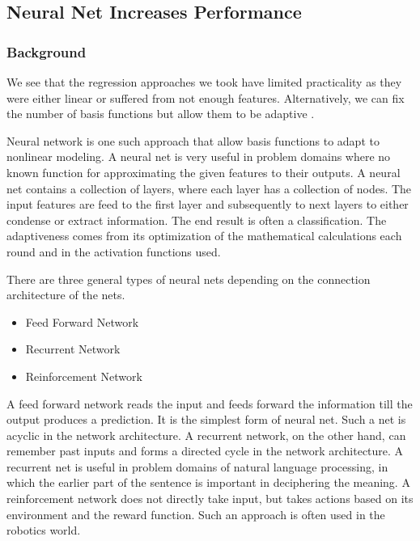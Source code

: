 \documentclass[]{article}
\begin{document}

\subsection{Neural Net Increases Performance}

\subsubsection{Background}

We see that the regression approaches we took have limited practicality as they were either linear or suffered from not enough features. Alternatively, we can fix the number of basis functions but allow them to be adaptive \cite{bishop}.

Neural network is one such approach that allow basis functions to adapt to nonlinear modeling. A neural net is very useful in problem domains where no known function for approximating the given features to their outputs. A neural net contains a collection of layers, where each layer has a collection of nodes. The input features are feed to the first layer and subsequently to next layers to either condense or extract information. The end result is often a classification. The adaptiveness comes from its optimization of the mathematical calculations each round and in the activation functions used.

There are three general types of neural nets depending on the connection architecture of the nets\cite{neuralnetdesign}. 

\begin{itemize}
\item
Feed Forward Network
\item
Recurrent Network
\item
Reinforcement Network 
\end{itemize}

A feed forward network reads the input and feeds forward the information till the output produces a prediction. It is the simplest form of neural net. Such a net is acyclic in the network architecture. A recurrent network, on the other hand, can remember past inputs and forms a directed cycle in the network architecture. A recurrent net is useful in problem domains of natural language processing, in which the earlier part of the sentence is important in deciphering the meaning. A reinforcement network does not directly take input, but takes actions based on its environment and the reward function. Such an approach is often used in the robotics world.
\end{document}
